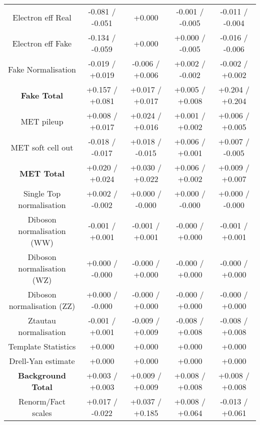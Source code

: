 \begin{table}[htbp]
\begin{center}
\begin{tabular}{|c|c|c|c|c|}
Electron eff Real                     &-0.081   / -0.051   & +0.000              & -0.001   / -0.005   & -0.011   / -0.004  \\
Electron eff Fake                     &-0.134   / -0.059   & +0.000              & +0.000   / -0.005   & -0.016   / -0.006  \\
Fake Normalisation                    &-0.019   / +0.019   & -0.006   / +0.006   & +0.002   / -0.002   & -0.002   / +0.002  \\
\hline
\textbf{Fake Total}                   &+0.157   / +0.081   & +0.017   / +0.017   & +0.005   / +0.008   & +0.204   / +0.204  \\
\hline
MET pileup                            &+0.008   / +0.017   & +0.024   / +0.016   & +0.001   / +0.002   & +0.006   / +0.005  \\
MET soft cell out                     &-0.018   / -0.017   & +0.018   / -0.015   & +0.006   / +0.001   & +0.007   / -0.005  \\
\hline
\textbf{MET Total}                    &+0.020   / +0.024   & +0.030   / +0.022   & +0.006   / +0.002   & +0.009   / +0.007  \\
\hline
Single Top normalisation              &+0.002   / -0.002   & +0.000   / -0.000   & +0.000   / -0.000   & +0.000   / -0.000  \\
Diboson normalisation (WW)            &-0.001   / +0.001   & -0.001   / +0.001   & -0.000   / +0.000   & -0.001   / +0.001  \\
Diboson normalisation (WZ)            &+0.000   / -0.000   & -0.000   / +0.000   & -0.000   / +0.000   & -0.000   / +0.000  \\
Diboson normalisation (ZZ)            &+0.000   / -0.000   & -0.000   / +0.000   & -0.000   / +0.000   & -0.000   / +0.000  \\
Ztautau normalisation                 &-0.001   / +0.001   & -0.009   / +0.009   & -0.008   / +0.008   & -0.008   / +0.008  \\
Template Statistics                   &+0.000              & +0.000              & +0.000              & +0.000             \\
Drell-Yan estimate                    &+0.000              & +0.000              & +0.000              & +0.000             \\
\hline
\textbf{Background Total}             &+0.003   / +0.003   & +0.009   / +0.009   & +0.008   / +0.008   & +0.008   / +0.008  \\
\hline
Renorm/Fact scales                    &+0.017   / -0.022   & +0.037   / +0.185   & +0.008   / +0.064   & -0.013   / +0.061  \\

\end{tabular}
\end{center}
\end{table}
